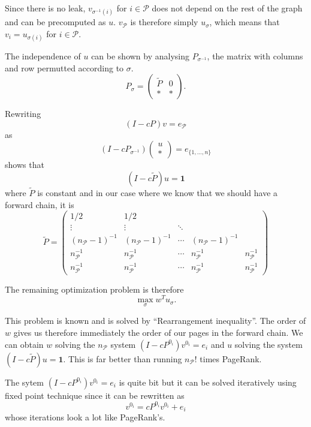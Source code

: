 \documentclass{article}
\newcommand{\1}{\mathbf{1}}
\theoremstyle{definition}
\begin{document}
Since there is no leak, \(v_{\sigma^{-1}(i)}\) for \(i \in \mathcal{P}\) does not depend on the rest of the graph and can be precomputed as \(u\).
\(v_\mathcal{P}\) is therefore simply \(u_\sigma\), which means that \(v_i = u_{\sigma(i)}\) for \(i \in \mathcal{P}\).

The independence of \(u\) can be shown by analysing \(P_{\sigma^{-1}}\), the matrix with columns and row permutted according to \(\sigma\).
\[ P_\sigma =
  \begin{pmatrix}
    \tilde{P} & 0\\
    * & *
  \end{pmatrix}.
\]

Rewriting
\[ (I - cP)v = e_\mathcal{P} \]
as
\[ (I - cP_{\sigma^{-1}})
\begin{pmatrix}
u\\
*
\end{pmatrix}
= e_{\{1,\ldots,n\}} \]
shows that
\[ (I - c\tilde{P})u = \1 \]
where \(\tilde{P}\) is constant and in our case
where we know that we should have a forward chain, it is
\[
  \tilde{P} =
  \begin{pmatrix}
    1/2 & 1/2 & & &\\
    \vdots & \vdots & \ddots & &\\
    (n_\mathcal{P}-1)^{-1} & (n_\mathcal{P}-1)^{-1} & \cdots & (n_\mathcal{P}-1)^{-1} & \\
    n_\mathcal{P}^{-1} & n_\mathcal{P}^{-1} & \cdots & n_\mathcal{P}^{-1} & n_\mathcal{P}^{-1}\\
    n_\mathcal{P}^{-1} & n_\mathcal{P}^{-1} & \cdots & n_\mathcal{P}^{-1} & n_\mathcal{P}^{-1}
  \end{pmatrix}
\]

The remaining optimization problem is therefore
\[ \max_\sigma w^T u_\sigma. \]

This problem is known and is solved by ``Rearrangement inequality''.
The order of \(w\) gives us therefore immediately the order of our pages in the forward chain.
We can obtain \(w\) solving the \(n_\mathcal{P}\) system \((I - cP^{0_i})v^{0_i} = e_i\)
and \(u\) solving the system \((I - c\tilde{P})u = \1\).
This is far better than running \(n_\mathcal{P}!\) times PageRank.

The sytem \((I - cP^{0_i})v^{0_i} = e_i\) is quite bit but it can be solved iteratively using fixed point technique since
it can be rewritten as
\[ v^{0_i} = cP^{0_i}v^{0_i} + e_i \]
whose iterations look a lot like PageRank's.
\end{document}
